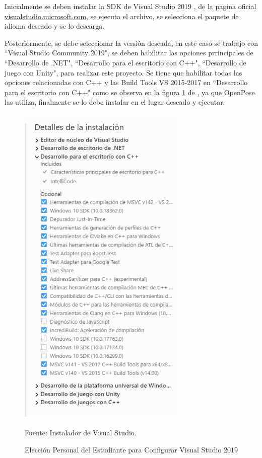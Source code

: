 Inicialmente se deben instalar la SDK de Visual Studio 2019 , de la pagina oficial  \href{https://visualstudio.microsoft.com/es/thank-you-downloading-visual-studio/?sku=Community&rel=16}{visualstudio.microsoft.com}, se ejecuta el archivo, se selecciona el paquete de idioma deseado y se lo descarga.

Posteriormente, se debe seleccionar la versión deseada, en este caso se trabajo con ``Visual Studio Community 2019", se deben habilitar las opciones prrincipales de ``Desarrollo de .NET", ``Desarrollo para el escritorio con C++", ``Desarrollo de juego con Unity", para realizar este proyecto. Se tiene que habilitar todas las opciones relacionadas con C++ y las Build Tools VS 2015-2017 en ``Desarrollo para el escritorio con C++" como se observa en la figura \ref{vsinstall} de , ya que OpenPose las utiliza, finalmente se lo debe instalar en el lugar deseado y ejecutar.


\begin{figure}[t!]
	\centering
	\includegraphics[width=8cm,height=16cm,]{./Images/eleccionesvsinstall.png}
	\caption{Elección Personal del Estudiante para Configurar Visual Studio 2019}
	\footnotesize Fuente: Instalador de Visual Studio.
	\label{vsinstall}
\end{figure}

